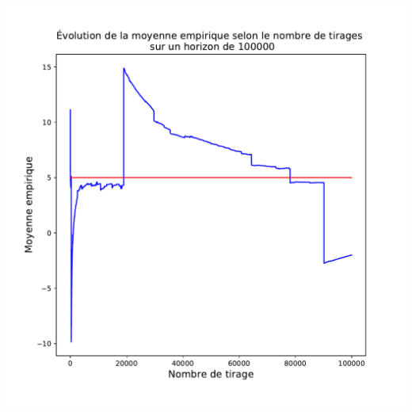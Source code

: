 \documentclass[8pt, sans]{beamer}
\begin{document}
\begin{frame}
\begin{columns}[T]
\pause

\begin{column}{0.5\linewidth}
\includegraphics[scale=0.28]{graphique-moyenne-empirique-2.pdf}
\end{column}%
\end{columns}

\end{frame}
\end{document}

